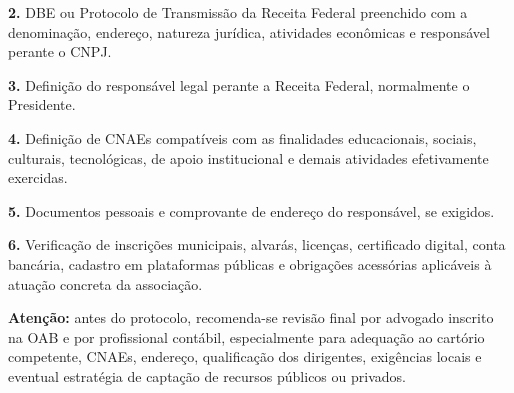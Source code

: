 \documentclass[11pt,a4paper]{article}
\begin{document}
\textbf{2.} DBE ou Protocolo de Transmissão da Receita Federal preenchido com a denominação, endereço, natureza jurídica, atividades econômicas e responsável perante o CNPJ.

\textbf{3.} Definição do responsável legal perante a Receita Federal, normalmente o Presidente.

\textbf{4.} Definição de CNAEs compatíveis com as finalidades educacionais, sociais, culturais, tecnológicas, de apoio institucional e demais atividades efetivamente exercidas.

\textbf{5.} Documentos pessoais e comprovante de endereço do responsável, se exigidos.

\textbf{6.} Verificação de inscrições municipais, alvarás, licenças, certificado digital, conta bancária, cadastro em plataformas públicas e obrigações acessórias aplicáveis à atuação concreta da associação.

\textbf{Atenção:} antes do protocolo, recomenda-se revisão final por advogado inscrito na OAB e por profissional contábil, especialmente para adequação ao cartório competente, CNAEs, endereço, qualificação dos dirigentes, exigências locais e eventual estratégia de captação de recursos públicos ou privados.
\end{document}
